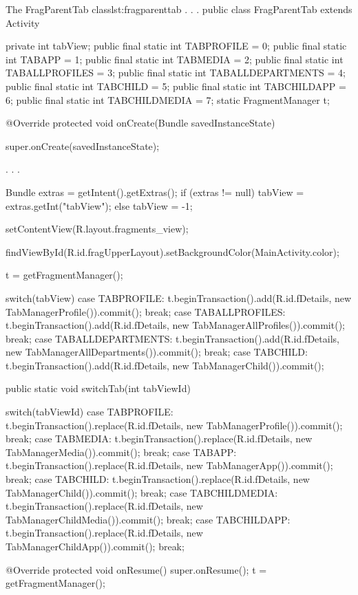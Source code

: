\begin{Java}{The FragParentTab class}{lst:fragparenttab}
.
.
.
public class FragParentTab extends Activity {

	private int tabView;
	public final static int TABPROFILE = 0;
	public final static int TABAPP = 1;
	public final static int TABMEDIA = 2;
	public final static int TABALLPROFILES = 3;
	public final static int TABALLDEPARTMENTS = 4;
	public final static int TABCHILD = 5;
	public final static int TABCHILDAPP = 6;
	public final static int TABCHILDMEDIA = 7;
	static FragmentManager t;

	@Override
	protected void onCreate(Bundle savedInstanceState) {
		super.onCreate(savedInstanceState);

		.
		.
		.

		Bundle extras = getIntent().getExtras();
		if (extras != null) {
			tabView = extras.getInt("tabView");
		} else {
			tabView = -1;
		}

		setContentView(R.layout.fragments_view);
		
		findViewById(R.id.fragUpperLayout).setBackgroundColor(MainActivity.color);

		t = getFragmentManager();

		switch(tabView) {
		case TABPROFILE:
			t.beginTransaction().add(R.id.fDetails, new TabManagerProfile()).commit();
			break;
		case TABALLPROFILES:
			t.beginTransaction().add(R.id.fDetails, new TabManagerAllProfiles()).commit();
			break;
		case TABALLDEPARTMENTS:
			t.beginTransaction().add(R.id.fDetails, new TabManagerAllDepartments()).commit();
			break;
		case TABCHILD:
			t.beginTransaction().add(R.id.fDetails, new TabManagerChild()).commit();
		}
	}

	public static void switchTab(int tabViewId) {

		switch(tabViewId) {
		case TABPROFILE:
			t.beginTransaction().replace(R.id.fDetails, new TabManagerProfile()).commit();
			break;
		case TABMEDIA:
			t.beginTransaction().replace(R.id.fDetails, new TabManagerMedia()).commit();
			break;
		case TABAPP:
			t.beginTransaction().replace(R.id.fDetails, new TabManagerApp()).commit();
			break;
		case TABCHILD:
			t.beginTransaction().replace(R.id.fDetails, new TabManagerChild()).commit();
			break;
		case TABCHILDMEDIA:
			t.beginTransaction().replace(R.id.fDetails, new TabManagerChildMedia()).commit();
			break;
		case TABCHILDAPP:
			t.beginTransaction().replace(R.id.fDetails, new TabManagerChildApp()).commit();
			break;
		}
	}
	
	@Override
	protected void onResume() {
		super.onResume();
		t = getFragmentManager();
	}
}
\end{Java}

